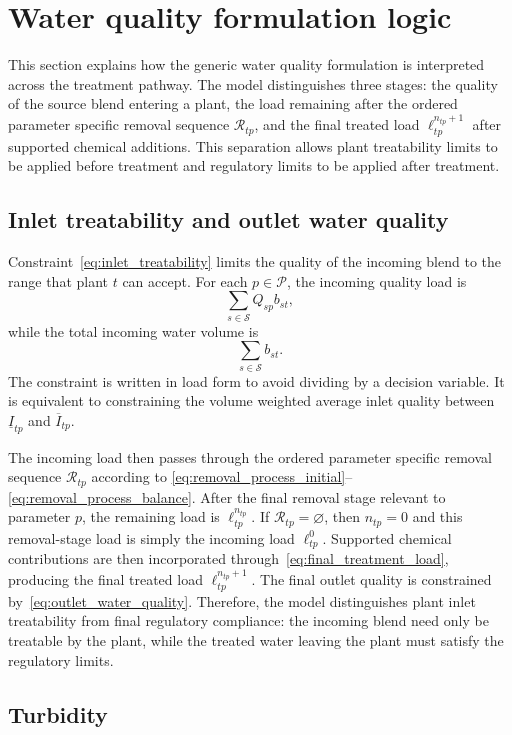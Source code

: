\documentclass[10pt]{article}
\begin{document}
\section{Water quality formulation logic}

This section explains how the generic water quality formulation is interpreted across the treatment pathway.
The model distinguishes three stages:
the quality of the source blend entering a plant, the load remaining after the ordered parameter specific removal sequence $\mathcal{R}_{tp}$, and the final treated load $\ell^{n_{tp}+1}_{tp}$ after supported chemical additions.
This separation allows plant treatability limits to be applied before treatment and regulatory limits to be applied after treatment.

\subsection{Inlet treatability and outlet water quality}

Constraint~\eqref{eq:inlet_treatability} limits the quality of the incoming blend to the range that plant $t$ can accept.
For each $p \in \mathcal{P}$, the incoming quality load is
\[
\sum_{s \in \mathcal{S}} Q_{sp}b_{st},
\]
while the total incoming water volume is
\[
\sum_{s \in \mathcal{S}} b_{st}.
\]
The constraint is written in load form to avoid dividing by a decision variable.
It is equivalent to constraining the volume weighted average inlet quality between $\underline{I}_{tp}$ and $\overline{I}_{tp}$.

The incoming load then passes through the ordered parameter specific removal sequence $\mathcal{R}_{tp}$ according to
\eqref{eq:removal_process_initial}--\eqref{eq:removal_process_balance}.
After the final removal stage relevant to parameter $p$, the remaining load is $\ell^{n_{tp}}_{tp}$.
If $\mathcal{R}_{tp}=\varnothing$, then $n_{tp}=0$ and this removal-stage load is simply the incoming load $\ell^0_{tp}$.
Supported chemical contributions are then incorporated through~\eqref{eq:final_treatment_load}, producing the final treated load $\ell^{n_{tp}+1}_{tp}$.
The final outlet quality is constrained by~\eqref{eq:outlet_water_quality}.
Therefore, the model distinguishes plant inlet treatability from final regulatory compliance:
the incoming blend need only be treatable by the plant, while the treated water leaving the plant must satisfy the regulatory limits.

\subsection{Turbidity}
\end{document}
